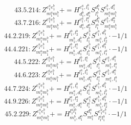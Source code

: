 \documentclass[letterpaper,10pt,fleqn,leqno,onecolumn]{article}
\begin{document}
\begin{equation} \;\;\;\;\;\;  43.5.214: Z^{e_{1}^{a}e_{1}^{b}}_{m_{1}^{a}m_{1}^{b}}+=H^{e_{1}^{a},l_{1}^{b}}_{d_{1}^{b},d_{1}^{a}}S^{d_{1}^{b}}_{l_{1}^{b}}S^{e_{1}^{b},d_{1}^{a}}_{m_{1}^{a}m_{1}^{b}} \end{equation}
\begin{equation} \;\;\;\;\;\;  43.7.216: Z^{e_{1}^{a}e_{1}^{b}}_{m_{1}^{a}m_{1}^{b}}+=H^{e_{1}^{a},l_{1}^{a}}_{d_{1}^{a},d_{2}^{a}}S^{d_{1}^{a}}_{l_{1}^{a}}S^{e_{1}^{b},d_{2}^{a}}_{m_{1}^{a}m_{1}^{b}} \end{equation}
\begin{equation} \;\;\;\;\;\;  44.2.219: Z^{e_{1}^{a}e_{1}^{b}}_{m_{1}^{a}m_{1}^{b}}+=H^{l_{1}^{b},l_{2}^{b}}_{m_{1}^{b},d_{1}^{b}}S^{e_{1}^{b}}_{l_{1}^{b}}S^{e_{1}^{a},d_{1}^{b}}_{m_{1}^{a},l_{2}^{b}}\cdot -1/1 \end{equation}
\begin{equation} \;\;\;\;\;\;  44.4.221: Z^{e_{1}^{a}e_{1}^{b}}_{m_{1}^{a}m_{1}^{b}}+=H^{l_{1}^{b},l_{1}^{a}}_{m_{1}^{b},d_{1}^{a}}S^{e_{1}^{b}}_{l_{1}^{b}}S^{e_{1}^{a},d_{1}^{a}}_{m_{1}^{a},l_{1}^{a}}\cdot -1/1 \end{equation}
\begin{equation} \;\;\;\;\;\;  44.5.222: Z^{e_{1}^{a}e_{1}^{b}}_{m_{1}^{a}m_{1}^{b}}+=H^{l_{1}^{b},l_{1}^{a}}_{m_{1}^{a},d_{1}^{b}}S^{e_{1}^{b}}_{l_{1}^{b}}S^{e_{1}^{a},d_{1}^{b}}_{m_{1}^{b},l_{1}^{a}} \end{equation}
\begin{equation} \;\;\;\;\;\;  44.6.223: Z^{e_{1}^{a}e_{1}^{b}}_{m_{1}^{a}m_{1}^{b}}+=H^{l_{1}^{a},l_{1}^{b}}_{m_{1}^{b},d_{1}^{a}}S^{e_{1}^{a}}_{l_{1}^{a}}S^{e_{1}^{b},d_{1}^{a}}_{m_{1}^{a},l_{1}^{b}} \end{equation}
\begin{equation} \;\;\;\;\;\;  44.7.224: Z^{e_{1}^{a}e_{1}^{b}}_{m_{1}^{a}m_{1}^{b}}+=H^{l_{1}^{a},l_{1}^{b}}_{m_{1}^{a},d_{1}^{b}}S^{e_{1}^{a}}_{l_{1}^{a}}S^{e_{1}^{b},d_{1}^{b}}_{m_{1}^{b},l_{1}^{b}}\cdot -1/1 \end{equation}
\begin{equation} \;\;\;\;\;\;  44.9.226: Z^{e_{1}^{a}e_{1}^{b}}_{m_{1}^{a}m_{1}^{b}}+=H^{l_{1}^{a},l_{2}^{a}}_{m_{1}^{a},d_{1}^{a}}S^{e_{1}^{a}}_{l_{1}^{a}}S^{e_{1}^{b},d_{1}^{a}}_{m_{1}^{b},l_{2}^{a}}\cdot -1/1 \end{equation}
\begin{equation} \;\;\;\;\;\;  45.2.229: Z^{e_{1}^{a}e_{1}^{b}}_{m_{1}^{a}m_{1}^{b}}+=H^{l_{1}^{a}l_{1}^{b}}_{m_{1}^{b},d_{1}^{a}}S^{d_{1}^{a}}_{m_{1}^{a}}S^{e_{1}^{a}e_{1}^{b}}_{l_{1}^{a}l_{1}^{b}}\cdot -1/1 \end{equation}
\end{document}
